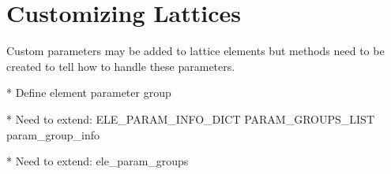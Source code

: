 \chapter{Customizing Lattices}
\label{c:custom-lat}



Custom parameters may be added to lattice elements but methods need to be created to tell \accellat
how to handle these parameters.

* Define element parameter group

* Need to extend:
  ELE_PARAM_INFO_DICT
  PARAM_GROUPS_LIST
  param_group_info



* Need to extend:
  ele_param_groups

